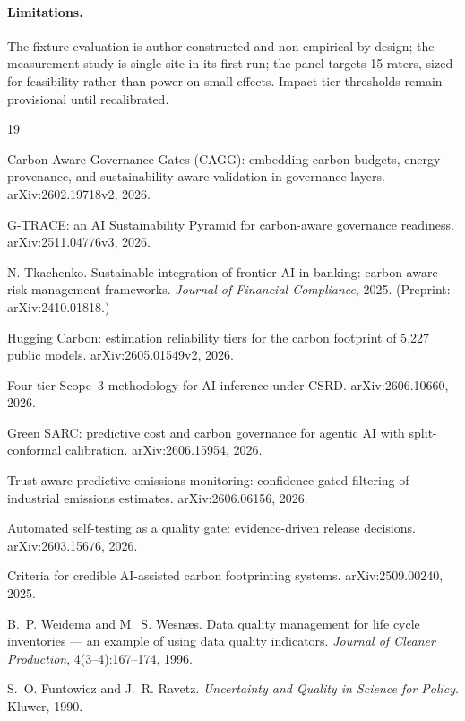 \documentclass[10pt]{article}
\begin{document}
\paragraph{Limitations.} The fixture evaluation is author-constructed and
non-empirical by design; the measurement study is single-site in its first
run; the panel targets 15 raters, sized for feasibility rather than power on
small effects. Impact-tier thresholds remain provisional until recalibrated.

\begin{thebibliography}{19}
\small

 Carbon-Aware Governance Gates (CAGG): embedding carbon
budgets, energy provenance, and sustainability-aware validation in
governance layers. arXiv:2602.19718v2, 2026.

 G-TRACE: an AI Sustainability Pyramid for carbon-aware
governance readiness. arXiv:2511.04776v3, 2026.

 N. Tkachenko. Sustainable integration of frontier AI in
banking: carbon-aware risk management frameworks. \emph{Journal of Financial
Compliance}, 2025. (Preprint: arXiv:2410.01818.)

 Hugging Carbon: estimation reliability tiers for the
carbon footprint of 5{,}227 public models. arXiv:2605.01549v2, 2026.

 Four-tier Scope~3 methodology for AI inference under
CSRD. arXiv:2606.10660, 2026.

 Green SARC: predictive cost and carbon governance for
agentic AI with split-conformal calibration. arXiv:2606.15954, 2026.

 Trust-aware predictive emissions monitoring:
confidence-gated filtering of industrial emissions estimates.
arXiv:2606.06156, 2026.

 Automated self-testing as a quality gate:
evidence-driven release decisions. arXiv:2603.15676, 2026.

 Criteria for credible AI-assisted carbon footprinting
systems. arXiv:2509.00240, 2025.

 B.~P. Weidema and M.~S. Wesn{\ae}s. Data quality management
for life cycle inventories --- an example of using data quality indicators.
\emph{Journal of Cleaner Production}, 4(3--4):167--174, 1996.

 S.~O. Funtowicz and J.~R. Ravetz. \emph{Uncertainty and
Quality in Science for Policy}. Kluwer, 1990.


\end{thebibliography}
\end{document}
